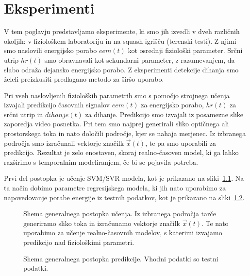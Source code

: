 \chapter{Eksperimenti}\label{sec:eksperimenti}
V tem poglavju predstavljamo eksperimente, ki smo jih izvedli v dveh različnih okoljih: v fiziološkem laboratoriju in na squash igrišču (terenski testi). Z njimi smo naslovili energijsko porabo $eem(t)$ kot osrednji fiziološki parameter. Srčni utrip $hr(t)$ smo obravnavali kot sekundarni parameter, z razumevanjem, da slabo odraža dejansko energijsko porabo. Z eksperimenti detekcije dihanja smo želeli preizkusiti predlagano metodo za širšo uporabo.

Pri vseh naslovljenih fizioloških parametrih smo s pomočjo strojnega učenja izvajali predikcijo časovnih signalov $eem(t)$ za energijsko porabo, $hr(t)$ za srčni utrip in $dihanje(t)$ za dihanje. Predikcijo smo izvajali iz posamezne slike zaporedja video posnetka. Pri tem smo najprej generirali sliko optičnega ali prostorskega toka in nato določili področje, kjer se nahaja merjenec. Iz izbranega področja smo izračunali vektorje značilk $\vec{x}(t)$, te pa smo uporabili za predikcijo. Rezultat je zelo enostaven, skoraj realno-časoven model, ki ga lahko razširimo s temporalnim modeliranjem, če bi se pojavila potreba. 

Prvi del postopka je učenje SVM/SVR modela, kot je prikazano na sliki~\ref{fig:shema-generalnega-postopka01}. Na ta način dobimo parametre regresijskega modela, ki jih nato uporabimo za napovedovanje porabe energije iz testnih podatkov, kot je prikazano na sliki~\ref{fig:shema-generalnega-postopka02}.

\begin{figure}[!htb]
	\centering
	\resizebox{\columnwidth}{!}{}
	\caption[Shema generalnega postopka učenja]{Shema generalnega postopka učenja. Iz izbranega področja tarče generiramo sliko toka in izračunamo vektorje značilk $\vec{x}(t)$. Te nato uporabimo za učenje realno-časovnih modelov, s katerimi izvajamo predikcijo nad fiziološkimi parametri.}
	\label{fig:shema-generalnega-postopka01}
\end{figure}

\begin{figure}[!htb]
	\centering
	\resizebox{\columnwidth}{!}{}
	\caption[Shema generalnega postopka predikcije]{Shema generalnega postopka predikcije. Vhodni podatki so testni podatki.}
	\label{fig:shema-generalnega-postopka02}
\end{figure}

